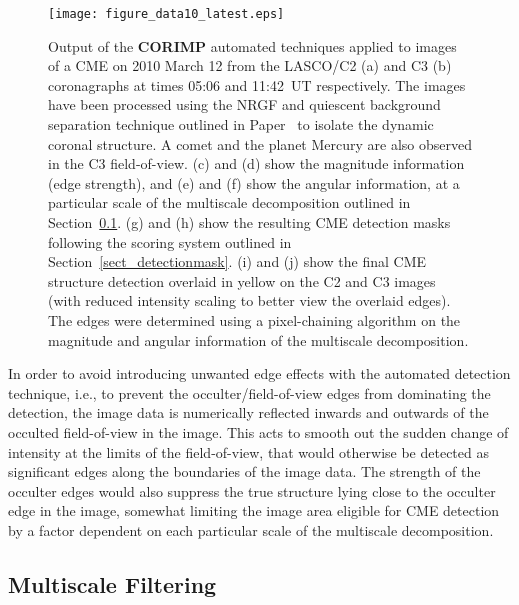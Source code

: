 \documentclass[preprint2]{aastex}
\newcommand{\RNum}[1]{\uppercase\expandafter{\romannumeral #1\relax}}
\begin{document}
\begin{figure}[!p]
\centerline{\texttt{[image: figure\_data10\_latest.eps]}}
\caption{Output of the {\bf CORIMP} automated techniques applied to images of a CME on 2010 March 12 from the LASCO/C2 (a) and C3 (b) coronagraphs at times 05:06 and 11:42~UT respectively. The images have been processed using the NRGF and quiescent background separation technique outlined in Paper~\RNum{1} to isolate the dynamic coronal structure. A comet and the planet Mercury are also observed in the C3 field-of-view. (c) and (d) show the magnitude information (edge strength), and (e) and (f) show the angular information, at a particular scale of the multiscale decomposition outlined in Section~\ref{sect_multiscale}. (g) and (h) show the resulting CME detection masks following the scoring system outlined in Section~\ref{sect_detectionmask}. (i) and (j) show the final CME structure detection overlaid in yellow on the C2 and C3 images (with reduced intensity scaling to better view the overlaid edges). The edges were determined using a pixel-chaining algorithm on the magnitude and angular information of the multiscale decomposition.}
\label{figure_data10}
\end{figure}

In order to avoid introducing unwanted edge effects with the automated detection technique, i.e., to prevent the occulter/field-of-view edges from dominating the detection, the image data is numerically reflected inwards and outwards of the occulted field-of-view in the image. This acts to smooth out the sudden change of intensity at the limits of the field-of-view, that would otherwise be detected as significant edges along the boundaries of the image data. The strength of the occulter edges would also suppress the true structure lying close to the occulter edge in the image, somewhat limiting the image area eligible for CME detection by a factor dependent on each particular scale of the multiscale decomposition.

\subsection{Multiscale Filtering}
\label{sect_multiscale}
\end{document}
